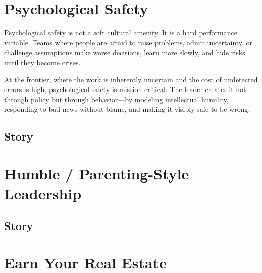 \section{Psychological Safety}


Psychological safety is not a soft cultural amenity. It is a hard performance
variable. Teams where people are afraid to raise problems, admit uncertainty, or
challenge assumptions make worse decisions, learn more slowly, and hide risks
until they become crises.

At the frontier, where the work is inherently uncertain and the cost of undetected
errors is high, psychological safety is mission-critical. The leader creates it
not through policy but through behavior---by modeling intellectual humility,
responding to bad news without blame, and making it visibly safe to be wrong.

\subsection{Story}

\section{Humble / Parenting-Style Leadership}



\subsection{Story}

\section{Earn Your Real Estate}

